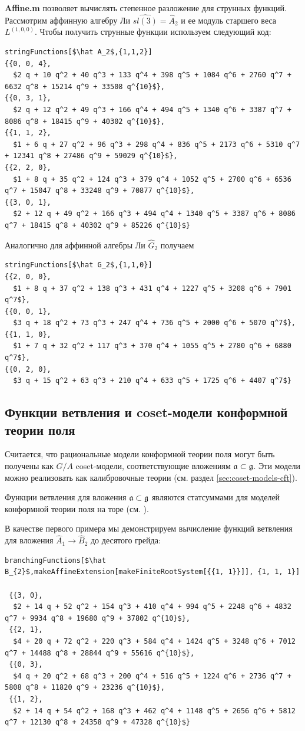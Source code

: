 {\bf Affine.m} позволяет вычислять степенное разложение для струнных функций. Рассмотрим аффинную алгебру Ли $\hat{sl(3)}=\hat A_{2}$ и ее модуль старшего веса $L^{(1,0,0)}$. Чтобы получить струнные функции используем следующий код:
\begin{lstlisting}[mathescape=true]
stringFunctions[$\hat A_2$,{1,1,2}]
{{0, 0, 4}, 
  $2 q + 10 q^2 + 40 q^3 + 133 q^4 + 398 q^5 + 1084 q^6 + 2760 q^7 + 6632 q^8 + 15214 q^9 + 33508 q^{10}$}, 
{{0, 3, 1}, 
  $2 q + 12 q^2 + 49 q^3 + 166 q^4 + 494 q^5 + 1340 q^6 + 3387 q^7 + 8086 q^8 + 18415 q^9 + 40302 q^{10}$}, 
{{1, 1, 2}, 
  $1 + 6 q + 27 q^2 + 96 q^3 + 298 q^4 + 836 q^5 + 2173 q^6 + 5310 q^7 + 12341 q^8 + 27486 q^9 + 59029 q^{10}$}, 
{{2, 2, 0}, 
  $1 + 8 q + 35 q^2 + 124 q^3 + 379 q^4 + 1052 q^5 + 2700 q^6 + 6536 q^7 + 15047 q^8 + 33248 q^9 + 70877 q^{10}$}, 
{{3, 0, 1}, 
  $2 + 12 q + 49 q^2 + 166 q^3 + 494 q^4 + 1340 q^5 + 3387 q^6 + 8086 q^7 + 18415 q^8 + 40302 q^9 + 85226 q^{10}$}
\end{lstlisting}
Аналогично для аффинной алгебры Ли $\hat G_{2}$ получаем
\begin{lstlisting}[mathescape=true]
stringFunctions[$\hat G_2$,{1,1,0}]
{{2, 0, 0}, 
  $1 + 8 q + 37 q^2 + 138 q^3 + 431 q^4 + 1227 q^5 + 3208 q^6 + 7901 q^7$}, 
{{0, 0, 1}, 
  $3 q + 18 q^2 + 73 q^3 + 247 q^4 + 736 q^5 + 2000 q^6 + 5070 q^7$}, 
{{1, 1, 0},
  $1 + 7 q + 32 q^2 + 117 q^3 + 370 q^4 + 1055 q^5 + 2780 q^6 + 6880 q^7$}, 
{{0, 2, 0}, 
  $3 q + 15 q^2 + 63 q^3 + 210 q^4 + 633 q^5 + 1725 q^6 + 4407 q^7$}
\end{lstlisting}

\subsection{Функции ветвления и  coset-модели конформной теории поля}
\label{sec:branch-funct-coset}

Считается, что рациональные модели конформной теории поля могут быть получены как  $G/A$ coset-модели, соответствующие вложениям $\mathfrak{a}\subset\mathfrak{g}$. Эти модели можно реализовать как калибровочные теории  \cite{Hwang:1994yr, hwang1993brst} (см. раздел \ref{sec:coset-models-cft}). 

Функции ветвления для вложения  $\mathfrak{a}\subset\mathfrak{g}$ являются статсуммами для моделей конформной теории поля на торе (см. \cite{difrancesco1997cft}).

В качестве первого примера мы демонстрируем вычисление функций ветвления для вложения $\hat A_{1}\to \hat B_{2}$ до десятого грейда:
\begin{lstlisting}[mathescape=true]
branchingFunctions[$\hat B_{2}$,makeAffineExtension[makeFiniteRootSystem[{{1, 1}}]], {1, 1, 1}]

 {{3, 0}, 
  $2 + 14 q + 52 q^2 + 154 q^3 + 410 q^4 + 994 q^5 + 2248 q^6 + 4832 q^7 + 9934 q^8 + 19680 q^9 + 37802 q^{10}$},
 {{2, 1}, 
  $4 + 20 q + 72 q^2 + 220 q^3 + 584 q^4 + 1424 q^5 + 3248 q^6 + 7012 q^7 + 14488 q^8 + 28844 q^9 + 55616 q^{10}$},
 {{0, 3}, 
  $4 q + 20 q^2 + 68 q^3 + 200 q^4 + 516 q^5 + 1224 q^6 + 2736 q^7 + 5808 q^8 + 11820 q^9 + 23236 q^{10}$},
 {{1, 2}, 
  $2 + 14 q + 54 q^2 + 168 q^3 + 462 q^4 + 1148 q^5 + 2656 q^6 + 5812 q^7 + 12130 q^8 + 24358 q^9 + 47328 q^{10}$}
\end{lstlisting}

